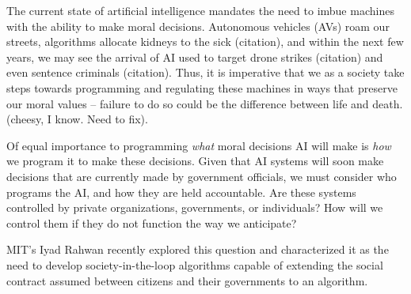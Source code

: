 The current state of artificial intelligence mandates the need to imbue machines with the ability to make moral decisions. Autonomous vehicles (AVs) roam our streets\cite{teslaSelfDrivingCar, uberSelfDrivingCar}, algorithms allocate kidneys to the sick (citation), and within the next few years, we may see the arrival of AI used to target drone strikes (citation) and even sentence criminals (citation). Thus, it is imperative that we as a society take steps towards programming and regulating these machines in ways that preserve our moral values -- failure to do so could be the difference between life and death. (cheesy, I know. Need to fix).

Of equal importance to programming \textit{what} moral decisions AI will make is \textit{how} we program it to make these decisions. Given that AI systems will soon make decisions that are currently made by government officials, we must consider who programs the AI, and how they are held accountable. Are these systems controlled by private organizations, governments, or individuals? How will we control them if they do not function the way we anticipate? 

MIT's Iyad Rahwan recently explored this question and characterized it as the need to develop society-in-the-loop algorithms capable of extending the social contract assumed between citizens and their governments to an algorithm. 

